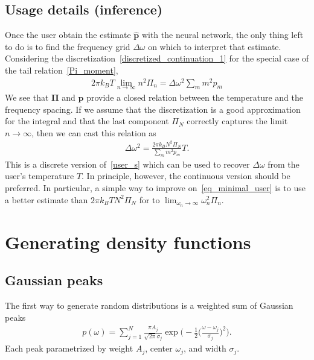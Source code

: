 \documentclass[notitlepage,11pt,nofootinbib]{revtex4-1}
\renewcommand{\vec}[1]{\bm{#1}}
\begin{document}
\subsection{Usage details (inference)}

Once the user obtain the estimate $\hat{\vec p}$ with the neural network, the only thing left to do is to find the frequency grid $\Delta\omega$ on which to interpret that estimate. Considering the discretization~\eqref{discretized_continuation_1} for the special case of the tail relation~\eqref{Pi_moment},
\begin{align}
    2\pi k_B T \lim_{n\rightarrow \infty}n^2 \Pi_n = \Delta\omega^2 \sum_m m^2 p_m
\end{align}
We see that $\vec \Pi$ and $\vec p$ provide a closed relation between the temperature and the frequency spacing. If we assume that the discretization is a good approximation for the integral and that the last component $\Pi_N$ correctly captures the limit $n\rightarrow\infty$, then we can cast this relation as
\begin{align}
    \Delta\omega^2 = 
    \frac{
        2\pi k_B 
        N^2 \Pi_N
    }{
        \sum_m m^2 p_m
    }
    T.
\label{eq_minimal_user}
\end{align}
This is a discrete version of~\eqref{user_s} which can be used to recover $\Delta\omega$ from the user's temperature $T$. In principle, however, the continuous version should be preferred. In particular, a simple way to improve on~\eqref{eq_minimal_user} is to use a better estimate than $2\pi k_B T N^2\Pi_N$ for to $\lim_{\omega_n\rightarrow \infty}\omega_n^2 \Pi_n$.

\section{Generating density functions}
\label{sec_distribution}
\subsection{Gaussian peaks}
The first way to generate random distributions is a weighted sum of Gaussian peaks 
\begin{align}
p(\omega)
=
\sum_{j=1}^{N} 
\frac{\pi A_j}{\sqrt{2\pi} \sigma_j}
\exp\bigg(-\frac{1}{2}\Big(\frac{\omega-\omega_j}{\sigma_j}\Big)^2\bigg).
\end{align}
Each peak parametrized by weight $A_j$, center $\omega_j$, and width $\sigma_j$.
\end{document}
